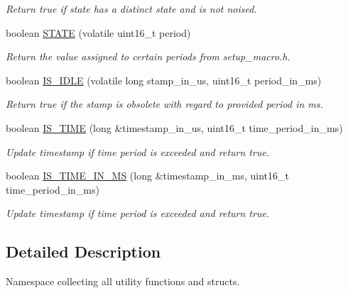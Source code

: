 \begin{DoxyCompactItemize}
\begin{DoxyCompactList}\small\item\em Return true if state has a distinct state and is not noised. \end{DoxyCompactList}\item 
boolean \hyperlink{namespaceSPMB_1_1util_a79946aad4b2a3f7c519ec1de8eb93b31}{S\+T\+A\+TE} (volatile uint16\+\_\+t period)\hypertarget{namespaceSPMB_1_1util_a79946aad4b2a3f7c519ec1de8eb93b31}{}\label{namespaceSPMB_1_1util_a79946aad4b2a3f7c519ec1de8eb93b31}

\begin{DoxyCompactList}\small\item\em Return the value assigned to certain periods from setup\+\_\+macro.\+h. \end{DoxyCompactList}\item 
boolean \hyperlink{namespaceSPMB_1_1util_a0e45982fbb1f2bcd0a10dee5abf979af}{I\+S\+\_\+\+I\+D\+LE} (volatile long stamp\+\_\+in\+\_\+us, uint16\+\_\+t period\+\_\+in\+\_\+ms)\hypertarget{namespaceSPMB_1_1util_a0e45982fbb1f2bcd0a10dee5abf979af}{}\label{namespaceSPMB_1_1util_a0e45982fbb1f2bcd0a10dee5abf979af}

\begin{DoxyCompactList}\small\item\em Return true if the stamp is obsolete with regard to provided period in ms. \end{DoxyCompactList}\item 
boolean \hyperlink{namespaceSPMB_1_1util_a985cd42455fd0468d9b9f06ade16de6f}{I\+S\+\_\+\+T\+I\+ME} (long \&timestamp\+\_\+in\+\_\+us, uint16\+\_\+t time\+\_\+period\+\_\+in\+\_\+ms)\hypertarget{namespaceSPMB_1_1util_a985cd42455fd0468d9b9f06ade16de6f}{}\label{namespaceSPMB_1_1util_a985cd42455fd0468d9b9f06ade16de6f}

\begin{DoxyCompactList}\small\item\em Update timestamp if time period is exceeded and return true. \end{DoxyCompactList}\item 
boolean \hyperlink{namespaceSPMB_1_1util_a90d2a4845fec1d38b017089d1faee2eb}{I\+S\+\_\+\+T\+I\+M\+E\+\_\+\+I\+N\+\_\+\+MS} (long \&timestamp\+\_\+in\+\_\+ms, uint16\+\_\+t time\+\_\+period\+\_\+in\+\_\+ms)\hypertarget{namespaceSPMB_1_1util_a90d2a4845fec1d38b017089d1faee2eb}{}\label{namespaceSPMB_1_1util_a90d2a4845fec1d38b017089d1faee2eb}

\begin{DoxyCompactList}\small\item\em Update timestamp if time period is exceeded and return true. \end{DoxyCompactList}\end{DoxyCompactItemize}


\subsection{Detailed Description}
Namespace collecting all utility functions and structs. 